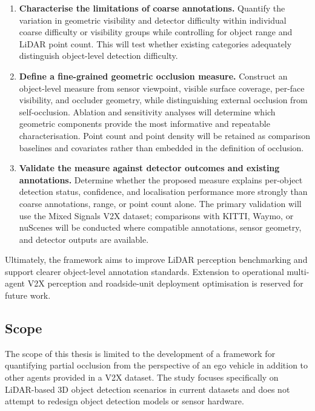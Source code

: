 \documentclass[12pt,a4paper]{article}
\begin{document}
\begin{enumerate}
    \item \textbf{Characterise the limitations of coarse annotations.} Quantify the variation in geometric visibility and detector difficulty within individual coarse difficulty or visibility groups while controlling for object range and LiDAR point count. This will test whether existing categories adequately distinguish object-level detection difficulty.

    \item \textbf{Define a fine-grained geometric occlusion measure.} Construct an object-level measure from sensor viewpoint, visible surface coverage, per-face visibility, and occluder geometry, while distinguishing external occlusion from self-occlusion. Ablation and sensitivity analyses will determine which geometric components provide the most informative and repeatable characterisation. Point count and point density will be retained as comparison baselines and covariates rather than embedded in the definition of occlusion.

    \item \textbf{Validate the measure against detector outcomes and existing annotations.} Determine whether the proposed measure explains per-object detection status, confidence, and localisation performance more strongly than coarse annotations, range, or point count alone. The primary validation will use the Mixed Signals V2X dataset; comparisons with KITTI, Waymo, or nuScenes will be conducted where compatible annotations, sensor geometry, and detector outputs are available.
\end{enumerate}

Ultimately, the framework aims to improve LiDAR perception benchmarking and support clearer object-level annotation standards. Extension to operational multi-agent V2X perception and roadside-unit deployment optimisation is reserved for future work.


\subsection{Scope}

The scope of this thesis is limited to the development of a framework
for quantifying partial occlusion from the perspective of an ego vehicle
in addition to other agents provided in a V2X dataset. The study focuses
specifically on LiDAR-based 3D object detection scenarios in current
datasets and does not attempt to redesign object detection models or
sensor hardware.
\end{document}
